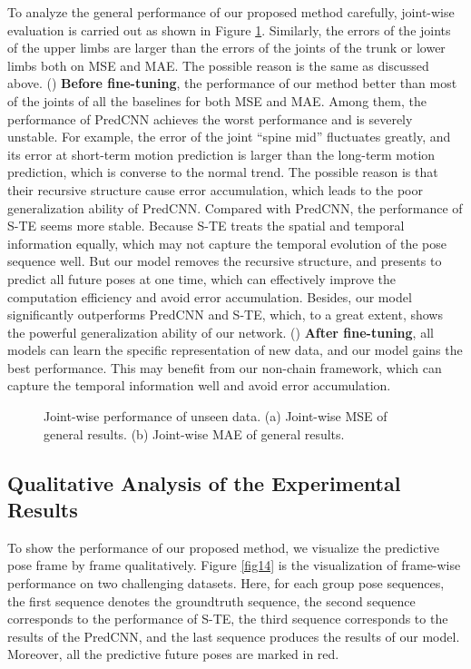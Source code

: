 \documentclass[journal]{IEEEtran}
\begin{document}
To analyze the general performance of our proposed method carefully, joint-wise evaluation is carried out as shown in Figure \ref{fig13}. Similarly, the errors of the joints of the upper limbs are larger than the errors of the joints of the trunk or lower limbs both on MSE and MAE. The possible reason is the same as discussed above. () {\bf Before fine-tuning}, the performance of our method better than most of the joints of all the baselines for both MSE and MAE. Among them, the performance of PredCNN achieves the worst performance and is severely unstable. For example, the error of the joint ``spine mid'' fluctuates greatly, and its error at short-term motion prediction is larger than the long-term motion prediction, which is converse to the normal trend. The possible reason is that their recursive structure cause error accumulation, which leads to the poor generalization ability of PredCNN. Compared with PredCNN, the performance of S-TE seems more stable. Because S-TE treats the spatial and temporal information equally, which may not capture the temporal evolution of the pose sequence well. But our model removes the recursive structure, and presents to predict all future poses at one time, which can effectively improve the computation efficiency and avoid error accumulation. Besides, our model significantly outperforms PredCNN and S-TE, which, to a great extent, shows the powerful generalization ability of our network. () {\bf After fine-tuning}, all models can learn the specific representation of new data, and our model gains the best performance. This may benefit from our non-chain framework, which can capture the temporal information well and avoid error accumulation.

\begin{figure}[!t]
\centering
{}
\hfil
{}
\caption{ Joint-wise performance of unseen data. (a) Joint-wise MSE of general results. (b) Joint-wise MAE of general results. }
\label{fig13}
\end{figure}


\subsection{Qualitative Analysis of the Experimental Results}
To show the performance of our proposed method, we visualize the predictive pose frame by frame qualitatively. Figure \ref{fig14} is the visualization of frame-wise performance on two challenging datasets. Here, for each group pose sequences, the first sequence denotes the groundtruth sequence, the second sequence corresponds to the performance of S-TE, the third sequence corresponds to the results of the PredCNN, and the last sequence produces the results of our model. Moreover, all the predictive future poses are marked in red.
\end{document}
